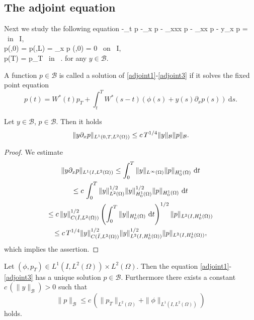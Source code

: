 \subsection{The adjoint equation}
\label{appendixadjoint}
Next we study the following equation
\besn
-\partial_t p -\partial_x p - \partial_{xxx} p - \gamma \partial_{xx} p  - y\partial_x p =  \phi \mbox{ in } I\times\Omega,\label{adjoint1}\\
p(\cdot,0) = p(\cdot,L) = \partial_x p (\cdot,0) = 0 \mbox{ on } I,\label{adjoint2}\\
p(T) = p_{T} \mbox{ in } \Omega.\label{adjoint3}
\eesn
for any $y\in \mathcal B$.
\begin{definition}
A function $p\in \mathcal B$ is called a solution of \eqref{adjoint1}-\eqref{adjoint3} if it solves the fixed point equation
\[
p(t)=W^*(t)p_T+\int_t^TW^*(s-t)(\phi(s)+y(s)\partial_x p(s))~\mathrm ds.
\]
\end{definition}
\begin{lemma}\label{lemadjoint}
  Let $y\in\mathcal B$, $p\in\mathcal B$. Then it holds
\[
\lVert y\partial_x p\rVert_{L^1(0,T,L^2(\Omega))} \leq c\,T^{1/4}\lVert y\rVert_{\mathcal{B}}\lVert p\rVert_{\mathcal{B}}.
\]
\end{lemma}
\begin{proof}
We estimate
\begin{multline*}
\lVert y\partial_x p\rVert_{L^1(I,L^2(\Omega))}\leq \int_0^T{\lVert y\rVert_{L^{\infty}(\Omega)}\lVert p\rVert_{H^1_0(\Omega)}}~\mathrm dt\\
\leq c\,\int_0^T{\lVert y\rVert_{L^2(\Omega)}^{1/2}\lVert y\rVert_{H^1_0(\Omega)}^{1/2}\lVert p\rVert_{H^1_0(\Omega)}}~\mathrm dt\\
\leq c\,\lVert y\rVert_{C(\bar I,L^2(\Omega))}^{1/2}\left( \int_0^T{\lVert y\rVert_{H^1_0(\Omega)}}~\mathrm dt\right)^{1/2}\lVert p\rVert_{L^2(I,H^1_0(\Omega))}\\
\leq c\, T^{1/4} \lVert y\rVert_{C(\bar I,L^2(\Omega))}^{1/2} \lVert y\rVert_{L^2(I,H^1_0(\Omega))}^{1/2}\lVert p\rVert_{L^2(I,H^1_0(\Omega))},
\end{multline*}
which implies the assertion.
\qquad\end{proof}
\begin{proposition}
Let $(\phi,p_T)\in L^1(I,L^2(\Omega))\times L^2(\Omega)$. Then the equation \eqref{adjoint1}-\eqref{adjoint3} has a unique solution $p\in \mathcal B$. Furthermore there exists a constant $c\,(\|y\|_{\mathcal B})>0$ such that
\begin{equation}\label{apriori_adjoint}
\|p\|_{\mathcal B}\leq c\,(\|p_T\|_{L^2(\Omega)}+\|\phi\|_{L^1(I,L^2(\Omega))})
\end{equation}
holds.
\end{proposition}
